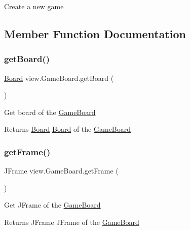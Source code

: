 Create a new game 

\subsection{Member Function Documentation}
\mbox{\label{classview_1_1_game_board_aeaf6c2e6d2daa244607497d69fab6a7d}} 
\subsubsection{\texorpdfstring{getBoard()}{getBoard()}}
{\footnotesize\ttfamily \mbox{\hyperlink{classview_1_1_board}{Board}} view.\+Game\+Board.\+get\+Board (\begin{DoxyParamCaption}{ }\end{DoxyParamCaption})\hspace{0.3cm}{\ttfamily [inline]}}

Get board of the \mbox{\hyperlink{classview_1_1_game_board}{Game\+Board}} \begin{DoxyReturn}{Returns}
\mbox{\hyperlink{classview_1_1_board}{Board}} \mbox{\hyperlink{classview_1_1_board}{Board}} of the \mbox{\hyperlink{classview_1_1_game_board}{Game\+Board}} 
\end{DoxyReturn}
\mbox{\label{classview_1_1_game_board_a09bcfcd93e2be82b26cfd730f5b23f76}} 
\subsubsection{\texorpdfstring{getFrame()}{getFrame()}}
{\footnotesize\ttfamily J\+Frame view.\+Game\+Board.\+get\+Frame (\begin{DoxyParamCaption}{ }\end{DoxyParamCaption})\hspace{0.3cm}{\ttfamily [inline]}}

Get J\+Frame of the \mbox{\hyperlink{classview_1_1_game_board}{Game\+Board}} \begin{DoxyReturn}{Returns}
J\+Frame J\+Frame of the \mbox{\hyperlink{classview_1_1_game_board}{Game\+Board}} 
\end{DoxyReturn}
\mbox{\label{classview_1_1_game_board_a1fd1c5a38e8342f2fd8d076f9e89ebe7}} 
